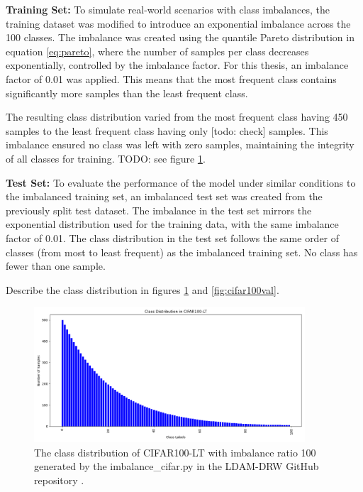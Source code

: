 \textbf{Training Set:} To simulate real-world scenarios with class imbalances, the training dataset was modified to introduce an exponential imbalance across the 100 classes. The imbalance was created using the quantile Pareto distribution in equation \eqref{eq:pareto}, where the number of samples per class decreases exponentially, controlled by the imbalance factor. For this thesis, an imbalance factor of 0.01 was applied. This means that the most frequent class contains significantly more samples than the least frequent class. 

The resulting class distribution varied from the most frequent class having 450 samples to the least frequent class having only [todo: check] samples.  This imbalance ensured no class was left with zero samples, maintaining the integrity of all classes for training. TODO: see figure \ref{fig:cifar100_imbalance_cifar}.

\textbf{Test Set:} To evaluate the performance of the model under similar conditions to the imbalanced training set, an imbalanced test set was created from the previously split test dataset. The imbalance in the test set mirrors the exponential distribution used for the training data, with the same imbalance factor of 0.01. The class distribution in the test set follows the same order of classes (from most to least frequent) as the imbalanced training set. No class has fewer than one sample.

Describe the class distribution in figures \ref{fig:cifar100_imbalance_cifar} and \ref{fig:cifar100val}.

\begin{figure}[H]
    \centering
    \includegraphics[width=0.9\textwidth]{Images/Plots/Class Distribution for CIFAR100-LT.png}
    \caption{The class distribution of CIFAR100-LT with imbalance ratio 100 generated by the imbalance\_cifar.py in the LDAM-DRW GitHub repository \cite{kaidic_ldam_drw}.}
    \label{fig:cifar100_imbalance_cifar}
\end{figure}

